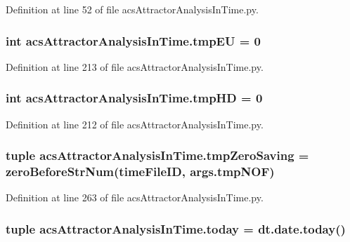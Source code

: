 Definition at line 52 of file acs\+Attractor\+Analysis\+In\+Time.\+py.

\hypertarget{a00125_a9019a56cfd992899ffc519204307a8ae}{
\subsubsection[{tmp\+E\+U}]{\setlength{\rightskip}{0pt plus 5cm}int acs\+Attractor\+Analysis\+In\+Time.\+tmp\+E\+U = 0}}\label{a00125_a9019a56cfd992899ffc519204307a8ae}


Definition at line 213 of file acs\+Attractor\+Analysis\+In\+Time.\+py.

\hypertarget{a00125_a35b7af9eb7cd962d33c5d56eae794c7b}{
\subsubsection[{tmp\+H\+D}]{\setlength{\rightskip}{0pt plus 5cm}int acs\+Attractor\+Analysis\+In\+Time.\+tmp\+H\+D = 0}}\label{a00125_a35b7af9eb7cd962d33c5d56eae794c7b}


Definition at line 212 of file acs\+Attractor\+Analysis\+In\+Time.\+py.

\hypertarget{a00125_ae86fc9dc3283934244ec28446445f722}{
\subsubsection[{tmp\+Zero\+Saving}]{\setlength{\rightskip}{0pt plus 5cm}tuple acs\+Attractor\+Analysis\+In\+Time.\+tmp\+Zero\+Saving = {\bf zero\+Before\+Str\+Num}(time\+File\+I\+D, args.\+tmp\+N\+O\+F)}}\label{a00125_ae86fc9dc3283934244ec28446445f722}


Definition at line 263 of file acs\+Attractor\+Analysis\+In\+Time.\+py.

\hypertarget{a00125_af30cd903eabfe4c9167f2a5d0062a4ce}{
\subsubsection[{today}]{\setlength{\rightskip}{0pt plus 5cm}tuple acs\+Attractor\+Analysis\+In\+Time.\+today = dt.\+date.\+today()}}\label{a00125_af30cd903eabfe4c9167f2a5d0062a4ce}


